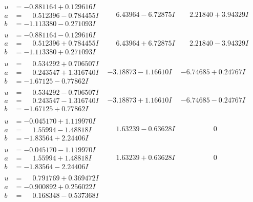 \documentclass[1p]{elsarticle_modified}
\theoremstyle{definition}
\begin{document}
$$\begin{array}{c|c|c}
\begin{aligned}
u &= -0.881164 + 0.129616 I \\
a &= \phantom{-}0.512396 - 0.784455 I \\
b &= -1.113380 - 0.271093 I\end{aligned}
 & \phantom{-}6.43964 - 6.72875 I & \phantom{-}2.21840 + 3.94329 I \\ \hline\begin{aligned}
u &= -0.881164 - 0.129616 I \\
a &= \phantom{-}0.512396 + 0.784455 I \\
b &= -1.113380 + 0.271093 I\end{aligned}
 & \phantom{-}6.43964 + 6.72875 I & \phantom{-}2.21840 - 3.94329 I \\ \hline\begin{aligned}
u &= \phantom{-}0.534292 + 0.706507 I \\
a &= \phantom{-}0.243547 + 1.316740 I \\
b &= -1.67125 - 0.77862 I\end{aligned}
 & -3.18873 - 1.16610 I & -6.74685 + 0.24767 I \\ \hline\begin{aligned}
u &= \phantom{-}0.534292 - 0.706507 I \\
a &= \phantom{-}0.243547 - 1.316740 I \\
b &= -1.67125 + 0.77862 I\end{aligned}
 & -3.18873 + 1.16610 I & -6.74685 - 0.24767 I \\ \hline\begin{aligned}
u &= -0.045170 + 1.119970 I \\
a &= \phantom{-}1.55994 - 1.48818 I \\
b &= -1.83564 + 2.24406 I\end{aligned}
 & \phantom{-}1.63239 - 0.63628 I & \phantom{-0.000000 } 0 \\ \hline\begin{aligned}
u &= -0.045170 - 1.119970 I \\
a &= \phantom{-}1.55994 + 1.48818 I \\
b &= -1.83564 - 2.24406 I\end{aligned}
 & \phantom{-}1.63239 + 0.63628 I & \phantom{-0.000000 } 0 \\ \hline\begin{aligned}
u &= \phantom{-}0.791769 + 0.369472 I \\
a &= -0.900892 + 0.256022 I \\
b &= \phantom{-}0.168348 - 0.537368 I\end{aligned}

\end{array}$$
\end{document}
